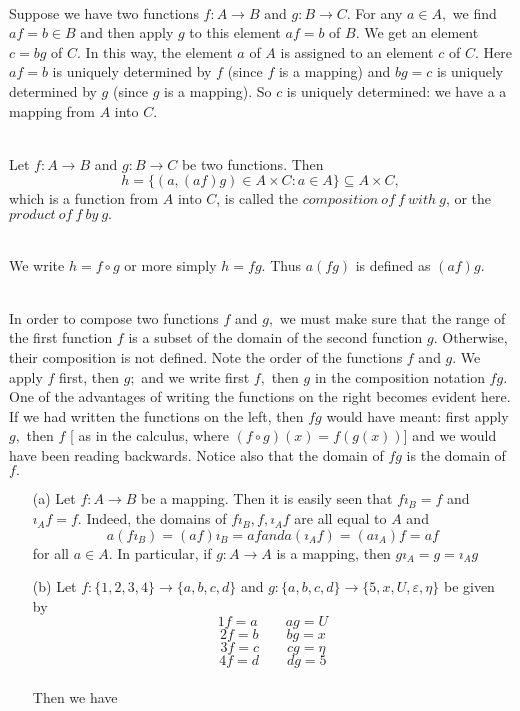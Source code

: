 \documentclass{article}
\begin{document}

\\Suppose we have two functions $f: A \rightarrow B$ and $g: B \rightarrow C.$ For any $a \in A,$ we find $af = b \in B$ and then apply $g$ to this element $af = b$ of $B.$ We get an element $c = bg$ of $C.$ In this way, the element $a$ of $A$ is assigned to an element $c$ of $C.$ Here $af = b$ is uniquely determined by $f$ (since $f$ is a mapping) and $bg = c$ is uniquely determined by $g$ (since $g$ is a mapping). So $c$ is uniquely determined: we have a a mapping from $A$ into $C.$

\begin{definition}
\\Let $f:A \rightarrow B$ and $g:B \rightarrow C$ be two functions. Then
$$
h = \{(a,(af)g) \in A \times C: a \in A\} \subseteq A \times C,
$$
which is a function from $A$ into $C$, is called the $composition\ of\ f\ with\ g$, or the $product\ of\ f\ by\ g.$
\end{definition}

\\We write $h = f \circ g$ or more simply $h = fg.$ Thus $a(fg)$ is defined as $(af)g.$

\\In order to compose two functions $f$ and $g,$ we must make sure that the range of the first function $f$ is a subset of the domain of the second function $g.$ Otherwise, their composition is not defined. Note the order of the functions $f$ and $g.$ We apply $f$ first, then $g;$ and we write first $f,$ then $g$ in the composition notation $fg.$ One of the advantages of writing the functions on the right becomes evident here. If we had written the functions on the left, then $fg$ would have meant: first apply $g,$ then $f$ [ as in the calculus, where $(f \circ g )(x) = f(g(x))$] and we would have been reading backwards. Notice also that the domain of $fg$ is the domain of $f.$

\begin{exmp}
\begin{enumerate}
    \item [(a)] Let $f: A \rightarrow B$ be a mapping. Then it is easily seen that $fı_B = f$ and $ı_Af = f.$ Indeed, the domains of $fı_B,f,ı_Af$ are all equal to $A$ and
    $$
    a(fı_B) = (af)ı_B = af and a(ı_Af) = (aı_A)f = af
    $$
    for all $a \in A.$ In particular, if $g:A \rightarrow A$ is a mapping, then $gı_A = g = ı_Ag$
    \item[(b)] Let $f: \{1,2,3,4\} \rightarrow \{a,b,c,d\}$ and $g: \{a,b,c,d\} \rightarrow \{5,x,U, \varepsilon , \eta \}$ be given by
    $$1f = a \qquad ag = U$$
    $$2f = b \qquad bg = x$$
    $$3f = c \qquad cg = \eta$$
    $$4f = d \qquad dg = 5$$
    \\Then we have
\end{enumerate}
\end{exmp}
\end{document}
